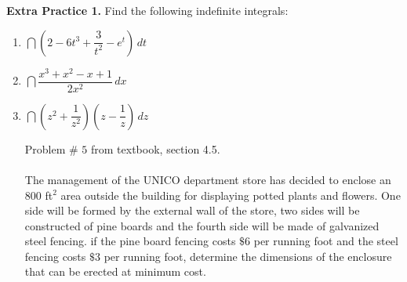 \documentclass[10pt]{article}
\begin{document}
\newpage%

{\bf\color{blue}Extra Practice 1.} Find the following indefinite integrals:

\begin{enumerate}

\item[(a)] $\dint \left(2 - 6t^3 + \dfrac{3}{t^2} - e^t \right)\,dt$

\vfill

\item[(b)] $\dint \dfrac{x^3+x^2-x+1}{2x^2}\,dx$

\vfill
\vfill

\item[(c)] $\dint \left( z^2 + \dfrac1{z^2}\right) \left( z - \dfrac{1}{z} \right) \, dz$

\vfill
\vfill
\newpage
\ep {} Problem \# $5$ from textbook, section 4.5.\\\\
The management of the UNICO department store has decided to enclose an $800$ ft$^2$ area outside the building for displaying potted plants and flowers.  One side will be formed by the external wall of the store, two sides will be constructed of pine boards and the fourth side will be made of galvanized steel fencing. if the pine board fencing costs $\$6$ per running foot and the steel fencing costs $\$3$ per running foot, determine the dimensions of the enclosure that can be erected at minimum cost.
\end{enumerate}
\end{document}
